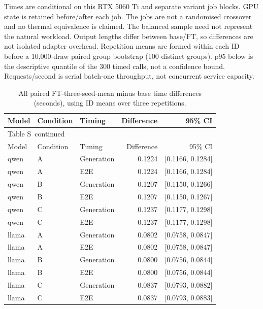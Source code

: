 \documentclass[10pt,a4paper]{article}
\renewcommand{\thetable}{S\arabic{table}}
\begin{document}
Times are conditional on this RTX 5060 Ti and separate variant job blocks. GPU state is retained before/after each job. The jobs are not a randomised crossover and no thermal equivalence is claimed. The balanced sample need not represent the natural workload. Output lengths differ between base/FT, so differences are not isolated adapter overhead. Repetition means are formed within each ID before a 10,000-draw paired group bootstrap (100 distinct groups). p95 below is the descriptive quantile of the 300 timed calls, not a confidence bound. Requests/second is serial batch-one throughput, not concurrent service capacity.


{\small
\setlength{\tabcolsep}{4pt}
\begin{longtable}{@{}lllrr@{}}
\caption{All paired FT-three-seed-mean minus base time differences (seconds), using ID means over three repetitions.}\label{sup:latency-paired}\\
\toprule
Model & Condition & Timing & Difference & 95\% CI \\
\midrule\endfirsthead
\multicolumn{5}{l}{\small Table \thetable\ continued}\\
\toprule
Model & Condition & Timing & Difference & 95\% CI \\
\midrule\endhead
\bottomrule\endfoot
qwen & A & Generation & 0.1224 & [0.1166, 0.1284] \\
qwen & A & E2E & 0.1224 & [0.1166, 0.1284] \\
qwen & B & Generation & 0.1207 & [0.1150, 0.1266] \\
qwen & B & E2E & 0.1207 & [0.1150, 0.1267] \\
qwen & C & Generation & 0.1237 & [0.1177, 0.1298] \\
qwen & C & E2E & 0.1237 & [0.1177, 0.1298] \\
llama & A & Generation & 0.0802 & [0.0758, 0.0847] \\
llama & A & E2E & 0.0802 & [0.0758, 0.0847] \\
llama & B & Generation & 0.0800 & [0.0756, 0.0844] \\
llama & B & E2E & 0.0800 & [0.0756, 0.0844] \\
llama & C & Generation & 0.0837 & [0.0793, 0.0882] \\
llama & C & E2E & 0.0837 & [0.0793, 0.0883] \\
\end{longtable}
}
\end{document}
